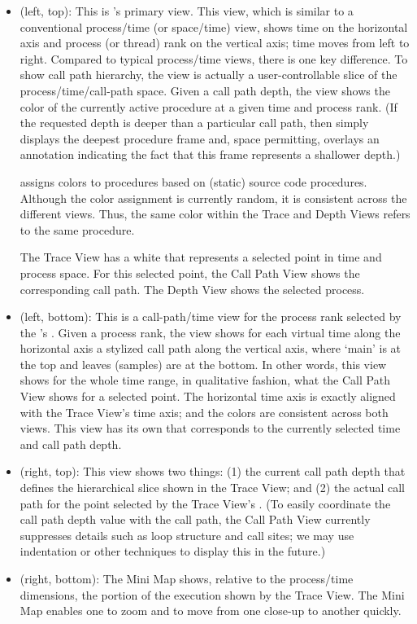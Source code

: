 \begin{itemize}
\item \textbf{\traceview} (left, top):
  This is \hpctraceviewer{}'s primary view.
  This view, which is similar to a conventional process/time (or space/time) view, shows time on the horizontal axis and process (or thread) rank on the vertical axis; time moves from left to right.
  Compared to typical process/time views, there is one key difference.
  To show call path hierarchy, the view is actually a user-controllable slice of the process/time/call-path space.
  Given a call path depth, the view shows the color of the currently active procedure at a given time and process rank.
  (If the requested depth is deeper than a particular call path, then \hpctraceviewer{} simply displays the deepest procedure frame and, space permitting, overlays an annotation indicating the fact that this frame represents a shallower depth.)

  \hpctraceviewer{} assigns colors to procedures based on (static) source code procedures.
  Although the color assignment is currently random, it is consistent across the different views.
  Thus, the same color within the Trace and Depth Views refers to the same procedure.

  The Trace View has a white \crosshair{} that represents a selected point in time and process space.
  For this selected point, the Call Path View shows the corresponding call path.
  The Depth View shows the selected process.

\item \textbf{\depthview} (left, bottom):
  This is a call-path/time view for the process rank selected by the \traceview's \crosshair{}.
  Given a process rank, the view shows for each virtual time along the horizontal axis a stylized call path along the vertical axis, where `main' is at the top and leaves (samples) are at the bottom.
  In other words, this view shows for the whole time range, in qualitative fashion, what the Call Path View shows for a selected point.
  The horizontal time axis is exactly aligned with the Trace View's time axis; and the colors are consistent across both views.
  This view has its own \crosshair{} that corresponds to the currently selected time and call path depth.

\item \textbf{\callview} (right, top):
  This view shows two things: (1) the current call path depth that defines the hierarchical slice shown in the Trace View; and (2) the actual call path for the point selected by the Trace View's \crosshair{}.
  (To easily coordinate the call path depth value with the call path, the Call Path View currently suppresses details such as loop structure and call sites; we may use indentation or other techniques to display this in the future.)

\item \textbf{\miniview} (right, bottom):
  The Mini Map shows, relative to the process/time dimensions, the portion of the execution shown by the Trace View.
  The Mini Map enables one to zoom and to move from one close-up to another quickly.

\end{itemize}

